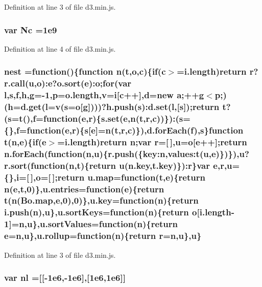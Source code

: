 Definition at line 3 of file d3.\+min.\+js.

\subsubsection[{Nc}]{\setlength{\rightskip}{0pt plus 5cm}var Nc =1e9}\label{d3_8min_8js_a3a0724e414f5b88f9d8e07fb90513b71}


Definition at line 4 of file d3.\+min.\+js.

\subsubsection[{nest}]{ nest =function()\{function {\bf n}(t,{\bf o},{\bf c})\{{\bf if}({\bf c}$>$=i.\+length){\bf return} {\bf r}?{\bf r.\+call}(u,{\bf o})\+:{\bf e}?{\bf o.\+sort}({\bf e})\+:{\bf o};{\bf for}(var l,s,{\bf f},h,g=-\/1,p=o.\+length,v={\bf i}[{\bf c}++],{\bf d}=new {\bf a};++g$<$p;)(h=d.\+get(l=v(s={\bf o}[g])))?h.\+push(s)\+:{\bf d.\+set}(l,[s]);{\bf return} t?(s=t(),{\bf f}=function({\bf e},{\bf r})\{{\bf s.\+set}({\bf e},{\bf n}(t,{\bf r},{\bf c}))\})\+:(s=\{\},{\bf f}=function({\bf e},{\bf r})\{s[{\bf e}]={\bf n}(t,{\bf r},{\bf c})\}),{\bf d.\+for\+Each}({\bf f}),s\}function t({\bf n},{\bf e})\{{\bf if}({\bf e}$>$=i.\+length){\bf return} {\bf n};var {\bf r}=[$\,$],u={\bf o}[{\bf e}++];{\bf return} {\bf n.\+for\+Each}(function({\bf n},u)\{r.\+push(\{key\+:n,values\+:t(u,{\bf e})\})\}),u?{\bf r.\+sort}(function({\bf n},t)\{{\bf return} u(n.\+key,t.\+key)\})\+:{\bf r}\}var {\bf e},{\bf r},u=\{\},{\bf i}=[$\,$],{\bf o}=[$\,$];{\bf return} {\bf u.\+map}=function(t,{\bf e})\{{\bf return} {\bf n}({\bf e},t,0)\},{\bf u.\+entries}=function({\bf e})\{{\bf return} t({\bf n}({\bf Bo.\+map},{\bf e},0),0)\},u.\+key=function({\bf n})\{{\bf return} i.\+push({\bf n}),u\},u.\+sort\+Keys=function({\bf n})\{{\bf return} {\bf o}[i.\+length-\/1]={\bf n},u\},u.\+sort\+Values=function({\bf n})\{{\bf return} {\bf e}={\bf n},u\},u.\+rollup=function({\bf n})\{{\bf return} {\bf r}={\bf n},u\},u\}}\label{d3_8min_8js_a9938323a201aa72d6c2a3cbfdda6cce6}


Definition at line 3 of file d3.\+min.\+js.

\subsubsection[{nl}]{\setlength{\rightskip}{0pt plus 5cm}var nl =[[-\/1e6,-\/1e6],[1e6,1e6]]}\label{d3_8min_8js_aec70eeaaa550094f03ce8bc426007e5c}


